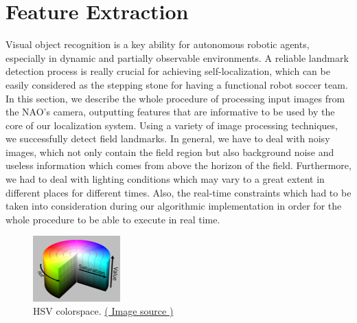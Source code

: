 \documentclass[	DIV=calc,%
							paper=a4,%
							fontsize=9pt,%
							twocolumn]{scrartcl}	 					%
\begin{document}
\section{Feature Extraction}
\label{sec:FeatureExtraction}
Visual object recognition is a key ability for autonomous robotic agents, especially in dynamic and partially observable environments. A reliable landmark detection process is really crucial for achieving self-localization, which can be easily considered as the stepping stone for having a functional robot soccer team. In this section, we describe the whole procedure of processing input images from the NAO's camera, outputting features that are informative to be used by the core of our localization system.  Using a variety of image processing techniques, we successfully detect field landmarks. In general, we have to deal with noisy images, which not only contain the field region but also background noise and useless information which comes from above the horizon of the field. Furthermore, we had to deal with lighting conditions which may vary to a great extent in different places for different times. Also, the real-time constraints which had to be taken into consideration during our algorithmic implementation in order for the whole procedure to be able to execute in real time.

\begin{figure}[t!]
  \caption{HSV colorspace. \href{http://en.wikipedia.org/wiki/HSL_and_HSV}{( Image source )}}
  \label{hsv}
  \centering
    \includegraphics[width=0.3\textwidth]{figures/1280px-HSV_color_solid_cylinder_alpha_lowgamma.png}
\end{figure}
\end{document}
